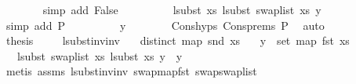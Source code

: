 \begin{isabellebody}
\ \ \ \ \ \ \isamarkupfalse%
\ {\isacharparenleft}{\kern0pt}simp\ add{\isacharcolon}{\kern0pt}\ False{\isacharparenright}{\kern0pt}\isanewline
\ \ \ \ \isamarkupfalse%
\ \isamarkupfalse%
\ {\isachardoublequoteopen}{\isachardot}{\kern0pt}{\isachardot}{\kern0pt}{\isachardot}{\kern0pt}\ {\isacharequal}{\kern0pt}\ lsubst\ xs\ {\isacharparenleft}{\kern0pt}lsubst\ {\isacharparenleft}{\kern0pt}swap{\isacharunderscore}{\kern0pt}list\ xs{\isacharparenright}{\kern0pt}\ y{\isacharparenright}{\kern0pt}{\isachardoublequoteclose}\isanewline
\ \ \ \ \ \ \isamarkupfalse%
\ {\isacharparenleft}{\kern0pt}simp\ add{\isacharcolon}{\kern0pt}\ P{}{\isacharparenright}{\kern0pt}\isanewline
\ \ \ \ \isamarkupfalse%
\ \isamarkupfalse%
\ {\isachardoublequoteopen}{\isachardot}{\kern0pt}{\isachardot}{\kern0pt}{\isachardot}{\kern0pt}\ {\isacharequal}{\kern0pt}\ y{\isachardoublequoteclose}\isanewline
\ \ \ \ \ \ \isamarkupfalse%
\ Cons{\isachardot}{\kern0pt}hyps\ Cons{\isachardot}{\kern0pt}prems{\isacharparenleft}{\kern0pt}{}{\isacharparenright}{\kern0pt}\ P{}\ \isamarkupfalse%
\ auto\isanewline
\ \ \ \ \isamarkupfalse%
\ \isamarkupfalse%
\ {\isacharquery}{\kern0pt}thesis\ \isakeywordONE{{\isachardot}{\kern0pt}}\isamarkupfalse%
\isanewline
\ \ \isamarkupfalse%
\isanewline
{}\isamarkupfalse%
%
\endisatagproof
{\isafoldproof}%
%
\isadelimproof
\isanewline
%
\endisadelimproof
\isanewline
\isanewline
{}\isamarkupfalse%
\ lsubst{\isacharunderscore}{\kern0pt}inv{\isacharunderscore}{\kern0pt}inv{}{\isacharcolon}{\kern0pt}\isanewline
\ \ \ {\isachardoublequoteopen}distinct\ {\isacharparenleft}{\kern0pt}map\ snd\ xs{\isacharparenright}{\kern0pt}{\isachardoublequoteclose}\isanewline
\ \ \ {\isachardoublequoteopen}y\ {\isasymin}\ set\ {\isacharparenleft}{\kern0pt}map\ fst\ xs{\isacharparenright}{\kern0pt}{\isachardoublequoteclose}\isanewline
\ \ \ {\isachardoublequoteopen}lsubst\ {\isacharparenleft}{\kern0pt}swap{\isacharunderscore}{\kern0pt}list\ xs{\isacharparenright}{\kern0pt}\ {\isacharparenleft}{\kern0pt}lsubst\ xs\ y{\isacharparenright}{\kern0pt}\ {\isacharequal}{\kern0pt}\ y{\isachardoublequoteclose}\isanewline
%
\isadelimproof
%
\endisadelimproof
%
\isatagproof
{}\isamarkupfalse%
\ {\isacharparenleft}{\kern0pt}metis\ assms{\isacharparenleft}{\kern0pt}{}{\isacharcomma}{\kern0pt}{}{\isacharparenright}{\kern0pt}\ lsubst{\isacharunderscore}{\kern0pt}inv{\isacharunderscore}{\kern0pt}inv\ swap{\isacharunderscore}{\kern0pt}map{\isacharunderscore}{\kern0pt}fst\ swap{\isacharunderscore}{\kern0pt}swap{\isacharunderscore}{\kern0pt}list{\isacharparenright}{\kern0pt}%

\end{isabellebody}
